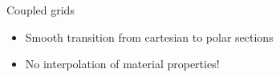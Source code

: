 %
%
%
%
%

\begin{frame}{Coupled grids}
  \begin{itemize}
  \item Smooth transition from cartesian to polar sections
  \item No interpolation of material properties!
  \end{itemize}
  \vfill
  \centering
  
\end{frame}

